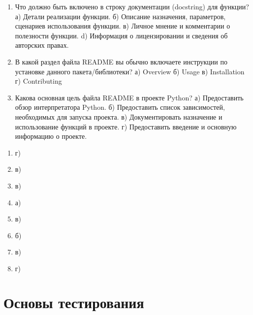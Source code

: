 \documentclass[letterpaper,10pt,russian]{sphinxmanual}
\begin{document}
\begin{enumerate}
\item {} 
\sphinxAtStartPar
Что должно быть включено в строку документации (docstring) для функции?
а) Детали реализации функции.
б) Описание назначения, параметров, сценариев использования функции.
в) Личное мнение и комментарии о полезности функции.
d) Информация о лицензировании и сведения об авторских правах.

\item {} 
\sphinxAtStartPar
В какой раздел файла README вы обычно включаете инструкции по установке данного пакета/библиотеки?
а) Overview
б) Usage
в) Installation
г) Contributing

\item {} 
\sphinxAtStartPar
Какова основная цель файла README в проекте Python?
а) Предоставить обзор интерпретатора Python.
б) Предоставить список зависимостей, необходимых для запуска проекта.
в) Документировать назначение и использование функций в проекте.
г) Предоставить введение и основную информацию о проекте.

\end{enumerate}

\sphinxAtStartPar
{}
\begin{enumerate}
%
\item {} 
\sphinxAtStartPar
г)

\item {} 
\sphinxAtStartPar
в)

\item {} 
\sphinxAtStartPar
в)

\item {} 
\sphinxAtStartPar
а)

\item {} 
\sphinxAtStartPar
в)

\item {} 
\sphinxAtStartPar
б)

\item {} 
\sphinxAtStartPar
в)

\item {} 
\sphinxAtStartPar
г)

\end{enumerate}


\chapter{Основы тестирования}
\label{\detokenize{index:id14}}
\sphinxstepscope
\end{document}
